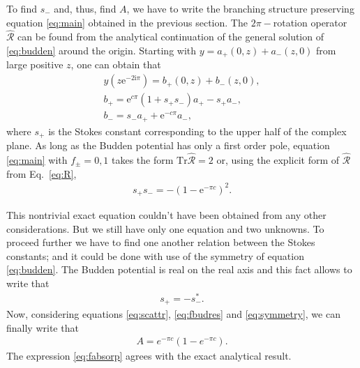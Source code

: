 \documentclass[aip,jmp,reprint]{revtex4-1}
\def\rmi{\mathrm{i}}
\def\rme{\mathrm{e}}
\def\R{\widehat{\mathcal{R}}}
\def\Tr{\mathrm{Tr}}
\begin{document}
To find $s_-$ and, thus, find $A$, we have to write the branching structure preserving 
equation \eqref{eq:main} obtained in the previous section. The $2\pi-$rotation operator $\R$
can be found from the analytical continuation of the general solution of \eqref{eq:budden}
around the origin. Starting with $y=a_+(0,z) + a_-(z,0)$ from large positive $z$, 
one can obtain that
\begin{subequations}
\label{eq:R}
\begin{eqnarray}
y(z \rme^{-2 \rmi \pi}) = b_+(0,z) + b_-(z,0),
\\
b_+ = \rme^{c \pi} (1 + s_+s_-)a_+ - s_+a_-,
\\
b_- = s_- a_+ + \rme^{-c \pi} a_-, 
\end{eqnarray}
\end{subequations}
where $s_+$ is the Stokes constant corresponding to the upper half of the complex plane.
As long as the Budden potential has only a first order pole, equation \eqref{eq:main}
with $f_\pm=0,1$ takes the form $\Tr\R=2$ or, using the explicit form of $\R$ from Eq.~\eqref{eq:R},
\begin{eqnarray}
s_+s_- = - (1-\rme^{- \pi c})^2.
\label{eq:fbudres}
\end{eqnarray}

This nontrivial exact equation couldn't have been obtained from any other considerations. But we
still have only one equation and two unknowns. To proceed further we have to find one another
relation between the Stokes constants; and it could be done with use of the symmetry 
of equation \eqref{eq:budden}. The Budden potential is real on the real axis and
this fact allows to write\cite{aksymm} that
\begin{eqnarray}
s_+ = -s_-^*.
\label{eq:symmetry}
\end{eqnarray}
Now, considering equations \eqref{eq:scattr}, \eqref{eq:fbudres} and \eqref{eq:symmetry}, we can
finally write that
\begin{eqnarray}
A = e^{-\pi c}(1-e^{-\pi c}).
\label{eq:fabsorp}
\end{eqnarray}
The expression \eqref{eq:fabsorp} agrees with the exact analytical result\cite{rwbook}.
\end{document}
